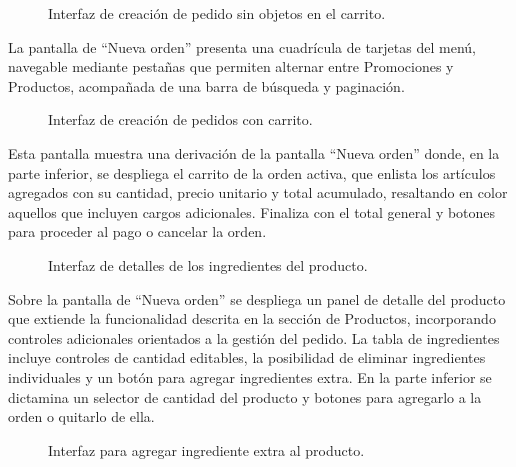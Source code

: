\begin{figure}[H]
    \centering
    
    \caption{Interfaz de creación de pedido sin objetos en el carrito.}
    \label{fig:ui-caj-09}
\end{figure}

La pantalla de ``Nueva orden'' presenta una cuadrícula de tarjetas del menú, navegable mediante pestañas que permiten alternar entre Promociones y Productos, acompañada de una barra de búsqueda y paginación.

\begin{figure}[H]
    \centering
    
    \caption{Interfaz de creación de pedidos con carrito.}
    \label{fig:ui-caj-10}
\end{figure}

Esta pantalla muestra una derivación de la pantalla ``Nueva orden'' donde, en la parte inferior, se despliega el carrito de la orden activa, que enlista los artículos agregados con su cantidad, precio unitario y total acumulado, resaltando en color aquellos que incluyen cargos adicionales. Finaliza con el total general y botones para proceder al pago o cancelar la orden.

\begin{figure}[H]
    \centering
    
    \caption{Interfaz de detalles de los ingredientes del producto.}
    \label{fig:ui-caj-11}
\end{figure}

Sobre la pantalla de ``Nueva orden'' se despliega un panel de detalle del producto que extiende la funcionalidad descrita en la sección de Productos, incorporando controles adicionales orientados a la gestión del pedido. La tabla de ingredientes incluye controles de cantidad editables, la posibilidad de eliminar ingredientes individuales y un botón para agregar ingredientes extra. En la parte inferior se dictamina un selector de cantidad del producto y botones para agregarlo a la orden o quitarlo de ella.

\begin{figure}[H]
    \centering
    
    \caption{Interfaz para agregar ingrediente extra al producto.}
    \label{fig:ui-caj-11-a}
\end{figure}

